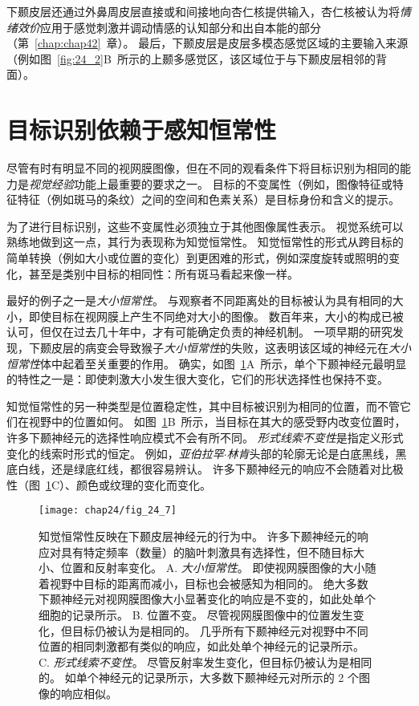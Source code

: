 下颞皮层还通过外鼻周皮层直接或和间接地向杏仁核提供输入，杏仁核被认为将\textit{情绪效价}应用于感觉刺激并调动情感的认知部分和出自本能的部分（第~\ref{chap:chap42}~章）。
最后，下颞皮层是皮层多模态感觉区域的主要输入来源（例如图~\ref{fig:24_2}B~所示的上颞多感觉区，该区域位于与下颞皮层相邻的背面）。



\section{目标识别依赖于感知恒常性}

尽管有时有明显不同的视网膜图像，但在不同的观看条件下将目标识别为相同的能力是\textit{视觉经验}功能上最重要的要求之一。
目标的不变属性（例如，图像特征或特征特征（例如斑马的条纹）之间的空间和色素关系）是目标身份和含义的提示。


为了进行目标识别，这些不变属性必须独立于其他图像属性表示。
视觉系统可以熟练地做到这一点，其行为表现称为知觉恒常性。
知觉恒常性的形式从跨目标的简单转换（例如大小或位置的变化）到更困难的形式，例如深度旋转或照明的变化，甚至是类别中目标的相同性：所有斑马看起来像一样。


最好的例子之一是\textit{大小恒常性}。
与观察者不同距离处的目标被认为具有相同的大小，即使目标在视网膜上产生不同绝对大小的图像。
数百年来，大小的构成已被认可，但仅在过去几十年中，才有可能确定负责的神经机制。
一项早期的研究发现，下颞皮层的病变会导致猴子\textit{大小恒常性}的失败，这表明该区域的神经元在\textit{大小恒常性}体中起着至关重要的作用。
确实，如图~\ref{fig:24_7}A~所示，单个下颞神经元最明显的特性之一是：即使刺激大小发生很大变化，它们的形状选择性也保持不变。


知觉恒常性的另一种类型是位置稳定性，其中目标被识别为相同的位置，而不管它们在视野中的位置如何。
如图~\ref{fig:24_7}B~所示，当目标在其大的感受野内改变位置时，许多下颞神经元的选择性响应模式不会有所不同。
\textit{形式线索不变性}是指定义形式变化的线索时形式的恒定。
例如，\textit{亚伯拉罕$\cdot$林肯}头部的轮廓无论是白底黑线，黑底白线，还是绿底红线，都很容易辨认。
许多下颞神经元的响应不会随着对比极性（图~\ref{fig:24_7}C）、颜色或纹理的变化而变化。


\begin{figure}[htbp]
	\centering
	\texttt{[image: chap24/fig\_24\_7]}
	\caption{知觉恒常性反映在下颞皮层神经元的行为中。
		许多下颞神经元的响应对具有特定频率（数量）的脑叶刺激具有选择性，但不随目标大小、位置和反射率变化。
		A. \textit{大小恒常性}。
		即使视网膜图像的大小随着视野中目标的距离而减小，目标也会被感知为相同的。
		绝大多数下颞神经元对视网膜图像大小显著变化的响应是不变的，如此处单个细胞的记录所示。
		B. 位置不变。
		尽管视网膜图像中的位置发生变化，但目标仍被认为是相同的。
		几乎所有下颞神经元对视野中不同位置的相同刺激都有类似的响应，如此处单个神经元的记录所示。
		C. \textit{形式线索不变性}。
		尽管反射率发生变化，但目标仍被认为是相同的。
		如单个神经元的记录所示，大多数下颞神经元对所示的 2 个图像的响应相似。}
	\label{fig:24_7}
\end{figure}



